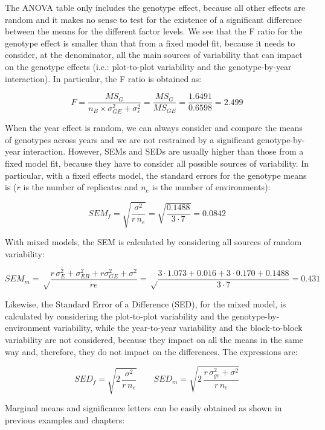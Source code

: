 \documentclass[a4paper,12pt,oneside]{book}
\begin{document}
The ANOVA table only includes the genotype effect, because all other effects are random and it makes no sense to test for the existence of a significant difference between the means for the different factor levels. We see that the F ratio for the genotype effect is smaller than that from a fixed model fit, because it needs to consider, at the denominator, all the main sources of variability that can impact on the genotype effects (i.e.: plot-to-plot variability and the genotype-by-year interaction). In particular, the F ratio is obtained as:

\[F = \frac{MS_G}{n_B \times \sigma^2_{GE} + \sigma^2_{\varepsilon}} = \frac{MS_G}{MS_{GE}} = \frac{1.6491}{0.6598} = 2.499\]

When the year effect is random, we can always consider and compare the means of genotypes across years and we are not restrained by a significant genotype-by-year interaction. However, SEMs and SEDs are usually higher than those from a fixed model fit, because they have to consider all possible sources of variability. In particular, with a fixed effects model, the standard errors for the genotype means is (\(r\) is the number of replicates and \(n_e\) is the number of environments):

\[SEM_f = \sqrt{ \frac{\sigma^2}{r\,n_e} } = \sqrt{ \frac{0.1488}{3 \cdot 7}} = 0.0842\]

With mixed models, the SEM is calculated by considering all sources of random variability:

\[SEM_m = \sqrt \frac{r \, \sigma^2_E  + \sigma^2_{EB} + r \sigma^2_{GE} + \sigma^2 }{re} = \sqrt \frac{3 \cdot 1.073  + 0.016 + 3 \cdot 0.170 + 0.1488 }{3 \cdot 7} = 0.431\]

Likewise, the Standard Error of a Difference (SED), for the mixed model, is calculated by considering the plot-to-plot variability and the genotype-by-environment variability, while the year-to-year variability and the block-to-block variability are not considered, because they impact on all the means in the same way and, therefore, they do not impact on the differences. The expressions are:

\[SED_f = \sqrt{2 \, \frac{\sigma^2}{r \, n_e} } \quad \quad SED_m = \sqrt {2 \, \frac{r \, \sigma^2_{ge}  + \sigma^2 }{r \, n_e} }\]

Marginal means and significance letters can be easily obtained as shown in previous examples and chapters:
\end{document}

